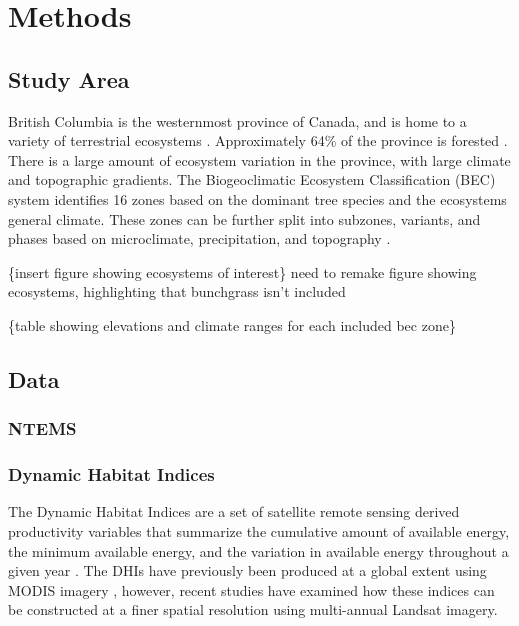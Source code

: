 \documentclass[
  authoryear,
  review,
  3p,
  twocolumn]{elsarticle}
\begin{document}
\hypertarget{methods}{%
\section{Methods}\label{methods}}

\hypertarget{study-area}{%
\subsection{Study Area}\label{study-area}}

British Columbia is the westernmost province of Canada, and is home to a
variety of terrestrial ecosystems \citep{pojar1987}. Approximately 64\%
of the province is forested \citep{bcministryofforests2003}. There is a
large amount of ecosystem variation in the province, with large climate
and topographic gradients. The Biogeoclimatic Ecosystem Classification
(BEC) system identifies 16 zones based on the dominant tree species and
the ecosystems general climate. These zones can be further split into
subzones, variants, and phases based on microclimate, precipitation, and
topography \citep{pojar1987}.

\{insert figure showing ecosystems of interest\} need to remake figure
showing ecosystems, highlighting that bunchgrass isn't included

\{table showing elevations and climate ranges for each included bec
zone\}

\hypertarget{data}{%
\subsection{Data}\label{data}}

\hypertarget{ntems}{%
\subsubsection{NTEMS}\label{ntems}}

\hypertarget{dynamic-habitat-indices}{%
\subsubsection{Dynamic Habitat Indices}\label{dynamic-habitat-indices}}

The Dynamic Habitat Indices are a set of satellite remote sensing
derived productivity variables that summarize the cumulative amount of
available energy, the minimum available energy, and the variation in
available energy throughout a given year \citep{radeloff2019}. The DHIs
have previously been produced at a global extent using MODIS imagery
\citep{radeloff2019}, however, recent studies have examined how these
indices can be constructed at a finer spatial resolution using
multi-annual Landsat imagery.
\end{document}
